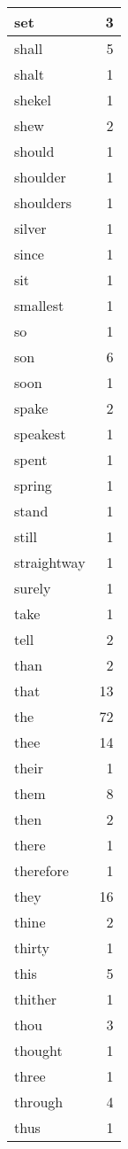 \begin{center}
\begin{longtable}{l|r}
set & 3 \\ \hline
shall & 5 \\ \hline
shalt & 1 \\ \hline
shekel & 1 \\ \hline
shew & 2 \\ \hline
should & 1 \\ \hline
shoulder & 1 \\ \hline
shoulders & 1 \\ \hline
silver & 1 \\ \hline
since & 1 \\ \hline
sit & 1 \\ \hline
smallest & 1 \\ \hline
so & 1 \\ \hline
son & 6 \\ \hline
soon & 1 \\ \hline
spake & 2 \\ \hline
speakest & 1 \\ \hline
spent & 1 \\ \hline
spring & 1 \\ \hline
stand & 1 \\ \hline
still & 1 \\ \hline
straightway & 1 \\ \hline
surely & 1 \\ \hline
take & 1 \\ \hline
tell & 2 \\ \hline
than & 2 \\ \hline
that & 13 \\ \hline
the & 72 \\ \hline
thee & 14 \\ \hline
their & 1 \\ \hline
them & 8 \\ \hline
then & 2 \\ \hline
there & 1 \\ \hline
therefore & 1 \\ \hline
they & 16 \\ \hline
thine & 2 \\ \hline
thirty & 1 \\ \hline
this & 5 \\ \hline
thither & 1 \\ \hline
thou & 3 \\ \hline
thought & 1 \\ \hline
three & 1 \\ \hline
through & 4 \\ \hline
thus & 1 \\ \hline

\end{longtable}
\end{center}

